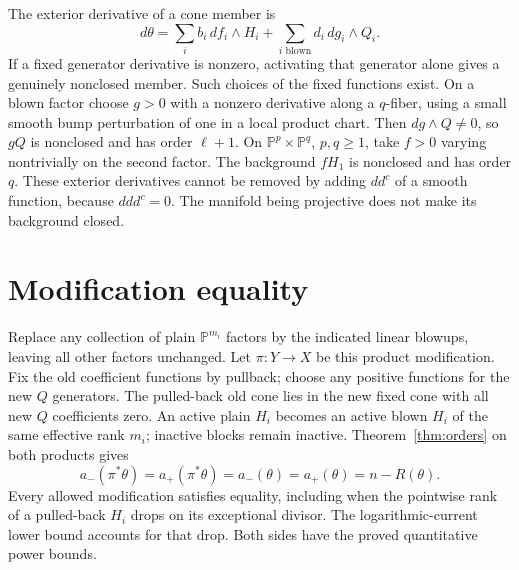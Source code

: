 \documentclass[11pt]{article}
\newcommand{\ddc}{dd^c}
\newcommand{\PP}{\mathbb P}
\begin{document}
The exterior derivative of a cone member is
\[
 d\theta=\sum_i b_i\,df_i\wedge H_i
       +\sum_{i\text{ blown}}d_i\,dg_i\wedge Q_i.
\]
If a fixed generator derivative is nonzero, activating that generator
alone gives a genuinely nonclosed member. Such choices of the fixed
functions exist. On a blown factor choose $g>0$ with a nonzero
derivative along a $q$-fiber, using a small
smooth bump perturbation of one in a local product chart. Then
$dg\wedge Q\ne0$, so $gQ$ is nonclosed and has order $\ell+1$.
On $\PP^p\times\PP^q$, $p,q\geq1$, take $f>0$ varying
nontrivially on the second factor. The background $fH_1$ is
nonclosed and has order $q$. These exterior derivatives cannot
be removed by adding $\ddc$ of a smooth function, because
$d\ddc=0$. The manifold being projective does not make its
background closed.

\section{Modification equality}
Replace any collection of plain $\PP^{m_i}$ factors by the indicated
linear blowups, leaving all other factors unchanged. Let $\pi:Y\to X$
be this product modification. Fix the old coefficient functions by
pullback; choose any positive functions for the new $Q$ generators.
The pulled-back old cone lies in the new fixed cone with all new
$Q$ coefficients zero. An active plain $H_i$ becomes an active blown
$H_i$ of the same effective rank $m_i$; inactive blocks remain
inactive. Theorem~\ref{thm:orders} on both products gives
\begin{equation}\label{eq:modification}
 a_-(\pi^*\theta)=a_+(\pi^*\theta)
                     =a_-(\theta)=a_+(\theta)=n-R(\theta).
\end{equation}
Every allowed modification satisfies equality, including when the
pointwise rank of a pulled-back $H_i$ drops on its exceptional divisor.
The logarithmic-current lower bound accounts for that drop. Both
sides have the proved quantitative power bounds.
\end{document}
